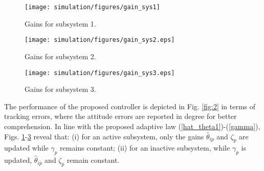 \documentclass[AMA,STIX1COL,sort, compress]{WileyNJD-v2}
\begin{document}
\begin{figure}[!h]
	\centering
	\texttt{[image: simulation/figures/gain\_sys1]}%
	\caption{{Gains for subsystem 1.}}\label{fig:3} %
\end{figure}
\begin{figure}[!h]
	\centering
	\texttt{[image: simulation/figures/gain\_sys2.eps]}%
	\caption{{Gains for subsystem 2.}}\label{fig:4} %
\end{figure}
\begin{figure}[!h]
	\centering
	\texttt{[image: simulation/figures/gain\_sys3.eps]}%
	\caption{{Gains for subsystem 3.}}\label{fig:5} %
\end{figure}

The performance of the proposed controller is depicted in Fig. \ref{fig:2} in terms of tracking errors, where the attitude errors are reported in degree for better comprehension. In line with the proposed adaptive law (\ref{hat_theta1})-(\ref{gamma}), Figs. \ref{fig:3}-\ref{fig:5} reveal that: (i) for an active subsystem, only the gains $\hat{\theta}_{i {p}}$ and $\zeta_p$ are updated while $\gamma_{p}$ remains constant; (ii) for an inactive subsystem, while $\gamma_{\overline{p}}$ is updated, $\hat{\theta}_{i \overline{p}}$ and $\zeta_{\overline p}$ remain constant. %
\end{document}
